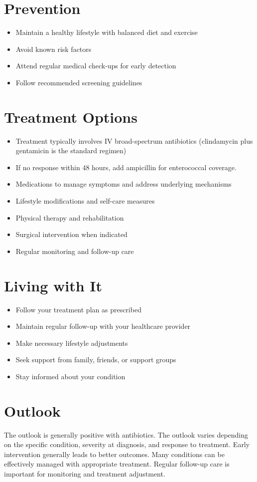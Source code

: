 \section{Prevention}
\begin{itemize}[noitemsep]
  \item Maintain a healthy lifestyle with balanced diet and exercise
  \item Avoid known risk factors
  \item Attend regular medical check-ups for early detection
  \item Follow recommended screening guidelines
\end{itemize}
\section{Treatment Options}
\begin{itemize}[noitemsep]
  \item Treatment typically involves IV broad-spectrum antibiotics (clindamycin plus gentamicin is the standard regimen)
  \item If no response within 48 hours, add ampicillin for enterococcal coverage.
  \item Medications to manage symptoms and address underlying mechanisms
  \item Lifestyle modifications and self-care measures
  \item Physical therapy and rehabilitation
  \item Surgical intervention when indicated
  \item Regular monitoring and follow-up care
\end{itemize}
\section{Living with It}
\begin{itemize}[noitemsep]
  \item Follow your treatment plan as prescribed
  \item Maintain regular follow-up with your healthcare provider
  \item Make necessary lifestyle adjustments
  \item Seek support from family, friends, or support groups
  \item Stay informed about your condition
\end{itemize}
\section{Outlook}
The outlook is generally positive with antibiotics. The outlook varies depending on the specific condition, severity at diagnosis, and response to treatment. Early intervention generally leads to better outcomes. Many conditions can be effectively managed with appropriate treatment. Regular follow-up care is important for monitoring and treatment adjustment.
